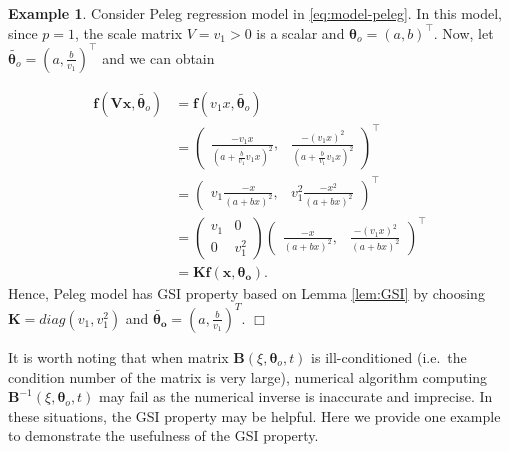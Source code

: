 \documentclass[
]{book}
\theoremstyle{definition}
\theoremstyle{definition}
\newtheorem{example}{Example}[chapter]
\theoremstyle{definition}
\theoremstyle{definition}
\theoremstyle{remark}
\begin{document}
\begin{example}
\protect\hypertarget{exm:peleg}{}\label{exm:peleg}Consider Peleg regression model in \eqref{eq:model-peleg}. In this model, since \(p=1\), the scale matrix \(V=v_1>0\) is a scalar and \(\boldsymbol{\theta}_o=(a,b)^\top\). Now, let \(\tilde{\boldsymbol{\theta}_o}=(a,\frac{b}{v_1})^\top\) and we can obtain

\begin{equation*}
\begin{aligned}
\boldsymbol{f}(\boldsymbol{V}\boldsymbol{x},\tilde{\boldsymbol{\theta}_o})  
        &= \boldsymbol{f}(v_1x,\tilde{\boldsymbol{\theta}_o})\\
        &= \begin{pmatrix}\frac{-v_1x}{(a+\frac{b}{v_1}v_1x)^2}, & \frac{-(v_1x)^2}{(a+\frac{b}{v_1}v_1x)^2}\end{pmatrix}^\top\\
        &=\begin{pmatrix} v_1\frac{-x}{(a+bx)^2}, & v_1^2\frac{-x^2}{(a+bx)^2}\end{pmatrix}^\top\\
        &= \begin{pmatrix} v_1  &0\\0&v_1^2\end{pmatrix}\begin{pmatrix} \frac{-x}{(a+bx)^2}, & \frac{-(v_1x)^2}{(a+bx)^2}\end{pmatrix}^\top\\
        &=\boldsymbol{K}\boldsymbol{f}(\boldsymbol{x},\boldsymbol{\theta_o}).
\end{aligned}
\end{equation*}
Hence, Peleg model has GSI property based on Lemma \ref{lem:GSI} by choosing \(\boldsymbol{K}=diag(v_1,v_1^2)\) and \(\tilde{\boldsymbol{\theta_o}}=(a,\frac{b}{v_1})^T\). \hfill\(\Box\)
\end{example}

It is worth noting that when matrix \(\boldsymbol{B}(\xi,\boldsymbol{\theta}_o,t)\) is ill-conditioned (i.e.~the condition number of the matrix is very large), numerical algorithm computing \(\boldsymbol{B}^{-1}(\xi,\boldsymbol{\theta}_o,t)\) may fail as the numerical inverse is inaccurate and imprecise. In these situations, the GSI property may be helpful. Here we provide one example to demonstrate the usefulness of the GSI property.
\end{document}
